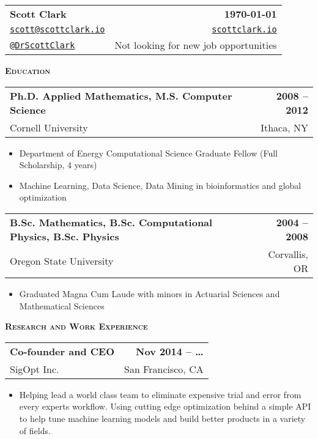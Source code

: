\documentclass[letterpaper, 11pt]{article}
\makeatletter
\renewcommand{\section}[1]{%
  \begin{tcolorbox}
    \textsc{\textbf{\large{#1}}}
  \end{tcolorbox}
}
\newcommand{\entry}[4]{%
  \begin{tabularx}{\linewidth}{@{}Xr@{}}
    \textbf{#2} & \textbf{#1} \\
    #3          & #4          \\
  \end{tabularx}
}
\newcommand{\email}[1]{\href{mailto:#1}{\texttt{#1}}}
\newcommand{\website}[1]{\href{http://#1}{\texttt{#1}}}
\newcommand{\twitter}[1]{\href{https://twitter.com/#1}{\texttt{@#1}}}
\makeatother
\begin{document}
  \begin{tabularx}{\linewidth}{@{}Xr@{}}
    \textbf{\Large{Scott Clark}} & \textbf{\today}                       \\
    \email{scott@scottclark.io}  & \website{scottclark.io}               \\
    \twitter{DrScottClark}       & Not looking for new job opportunities \\
  \end{tabularx}

  \section{Education}

  \entry{2008 -- 2012}{Ph.D. Applied Mathematics, M.S. Computer Science}{Cornell University}{Ithaca, NY}
  \begin{itemize}
    \item{Department of Energy Computational Science Graduate Fellow (Full Scholarship, 4 years)}
    \item{Machine Learning, Data Science, Data Mining in bioinformatics and global optimization}
  \end{itemize}

  \entry{2004 -- 2008}{B.Sc. Mathematics, B.Sc. Computational Physics, B.Sc. Physics}{Oregon State University}{Corvallis, OR}
  \begin{itemize}
    \item{Graduated Magna Cum Laude with minors in Actuarial Sciences and Mathematical Sciences}
  \end{itemize}

  \section{Research and Work Experience}

  \entry{Nov 2014 -- \ldots}{Co-founder and CEO}{SigOpt Inc.}{San Francisco, CA}
  \begin{itemize}
    \item{Helping lead a world class team to eliminate expensive trial and error from every experts workflow. Using cutting edge optimization behind a simple API to help tune machine learning models and build better products in a variety of fields.}
  \end{itemize}
\end{document}
